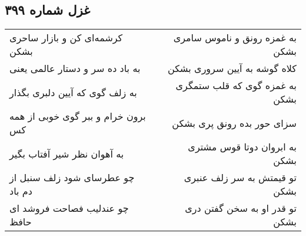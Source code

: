 \begin{center}
\section*{غزل شماره ۳۹۹}
\label{sec:sh399}
\begin{longtable}{l p{0.5cm} r}
کرشمه‌ای کن و بازار ساحری بشکن
&&
به غمزه رونق و ناموس سامری بشکن
\\
به باد ده سر و دستار عالمی یعنی
&&
کلاه گوشه به آیین سروری بشکن
\\
به زلف گوی که آیین دلبری بگذار
&&
به غمزه گوی که قلب ستمگری بشکن
\\
برون خرام و ببر گوی خوبی از همه کس
&&
سزای حور بده رونق پری بشکن
\\
به آهوان نظر شیر آفتاب بگیر
&&
به ابروان دوتا قوس مشتری بشکن
\\
چو عطرسای شود زلف سنبل از دم باد
&&
تو قیمتش به سر زلف عنبری بشکن
\\
چو عندلیب فصاحت فروشد ای حافظ
&&
تو قدر او به سخن گفتن دری بشکن
\\
\end{longtable}
\end{center}
